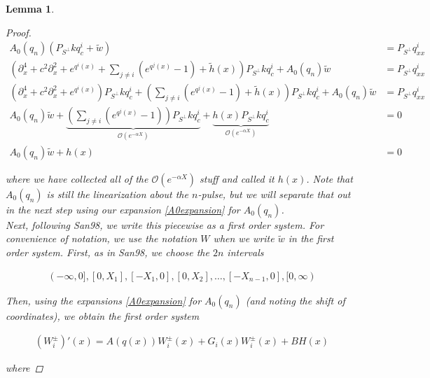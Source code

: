 \documentclass[12pt]{article}
\newtheorem{lemma}{Lemma}
\begin{document}
\begin{lemma}
\begin{proof}
\begin{align*}
A_0(q_n) (P_{S^\perp} k q^i_c + \tilde{w}) &= P_{S^\perp} q^i_{xx} \\
\left(\partial_x^4 + c^2 \partial_x^2 + e^{q^i(x)} + \sum_{j \neq i} (e^{q^j(x)} - 1) + \tilde{h}(x) \right)P_{S^\perp} k q^i_c + A_0(q_n) \tilde{w} &= P_{S^\perp} q^i_{xx} \\
(\partial_x^4 + c^2 \partial_x^2 + e^{q^i(x)})P_{S^\perp} k q^i_c + \left( \sum_{j \neq i} (e^{q^j(x)} - 1)+ \tilde{h}(x) \right) P_{S^\perp}k q^i_c + A_0(q_n) \tilde{w} &= P_{S^\perp} q^i_{xx} \\
A_0(q_n) \tilde{w} + \underbrace{\left( \sum_{j \neq i} (e^{q^j(x)} - 1)\right) P_{S^\perp} k q^i_c}_{\mathcal{O}(e^{-\alpha X})} 
+ \underbrace{h(x) P_{S^\perp}k q^i_c}_{\mathcal{O}(e^{-\alpha X})} &= 0 \\
A_0(q_n) \tilde{w} + h(x) &= 0
\end{align*}

where we have collected all of the $\mathcal{O}(e^{-\alpha X})$ stuff and called it $h(x)$. Note that $A_0(q_n)$ is still the linearization about the $n$-pulse, but we will separate that out in the next step using our expansion \eqref{A0expansion} for $A_0(q_n)$.\\

Next, following San98, we write this piecewise as a first order system. For convenience of notation, we use the notation $W$ when we write $\tilde{w}$ in the first order system. First, as in San98, we choose the $2n$ intervals 

\begin{align*}
(-\infty, 0], [0, X_1], [-X_1, 0], [0, X_2], \dots, [-X_{n-1}, 0], [0, \infty)
\end{align*}

Then, using the expansions \eqref{A0expansion} for $A_0(q_n)$ (and noting the shift of coordinates), we obtain the first order system

\begin{align*}
(W_i^\pm)'(x) = A(q(x)) W_i^\pm(x) + G_i(x) W_i^\pm(x) + B H(x)
\end{align*}

where


\end{proof}
\end{lemma}
\end{document}
